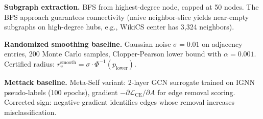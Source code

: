 \documentclass[conference]{IEEEtran}
\begin{document}
\textbf{Subgraph extraction.} BFS from highest-degree node, capped at 50 nodes. The BFS approach guarantees connectivity (naive neighbor-slice yields near-empty subgraphs on high-degree hubs, e.g., WikiCS center has 3,324 neighbors).

\textbf{Randomized smoothing baseline.} Gaussian noise $\sigma = 0.01$ on adjacency entries, 200 Monte Carlo samples, Clopper-Pearson lower bound with $\alpha = 0.001$. Certified radius: $r_v^{\text{smooth}} = \sigma \cdot \Phi^{-1}(p_{\text{lower}})$.

\textbf{Mettack baseline.} Meta-Self variant: 2-layer GCN surrogate trained on IGNN pseudo-labels (100 epochs), gradient $-\partial \mathcal{L}_{\text{CE}} / \partial A$ for edge removal scoring. Corrected sign: negative gradient identifies edges whose removal increases misclassification.



\end{document}
